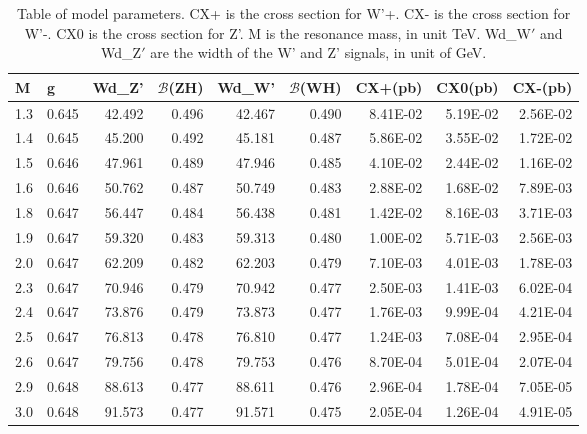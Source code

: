 \begin{table}[htbp]
\caption{Table of model parameters. CX+ is the cross section for W'+. 
CX- is the cross section for W'-. CX0 is the cross section for Z'. M is the resonance mass, in unit
TeV. Wd\_W$\prime$ and Wd\_Z$\prime$ are the width of the W' and Z' signals, in unit of GeV.}
\begin{tabular}{|r|r|r|r|r|r|r|r|r|}
\hline
\multicolumn{1}{|l|}{M} & \multicolumn{1}{l|}{ g} & \multicolumn{1}{l|}{Wd\_Z'} & \multicolumn{1}{l|}{$\mathcal{B}$(ZH)} & \multicolumn{1}{l|}{Wd\_W'} & \multicolumn{1}{l|}{$\mathcal{B}$(WH)} & \multicolumn{1}{l|}{ CX+(pb)} & \multicolumn{1}{l|}{ CX0(pb)} & \multicolumn{1}{l|}{ CX-(pb)} \\ \hline

1.3 & 0.645 & 42.492 & 0.496 & 42.467 & 0.490 & 8.41E-02 & 5.19E-02 & 2.56E-02 \\ \hline
1.4 & 0.645 & 45.200 & 0.492 & 45.181 & 0.487 & 5.86E-02 & 3.55E-02 & 1.72E-02 \\ \hline
1.5 & 0.646 & 47.961 & 0.489 & 47.946 & 0.485 & 4.10E-02 & 2.44E-02 & 1.16E-02 \\ \hline
1.6 & 0.646 & 50.762 & 0.487 & 50.749 & 0.483 & 2.88E-02 & 1.68E-02 & 7.89E-03 \\ \hline
1.8 & 0.647 & 56.447 & 0.484 & 56.438 & 0.481 & 1.42E-02 & 8.16E-03 & 3.71E-03 \\ \hline
1.9 & 0.647 & 59.320 & 0.483 & 59.313 & 0.480 & 1.00E-02 & 5.71E-03 & 2.56E-03 \\ \hline
2.0 & 0.647 & 62.209 & 0.482 & 62.203 & 0.479 & 7.10E-03 & 4.01E-03 & 1.78E-03 \\ \hline
2.3 & 0.647 & 70.946 & 0.479 & 70.942 & 0.477 & 2.50E-03 & 1.41E-03 & 6.02E-04 \\ \hline
2.4 & 0.647 & 73.876 & 0.479 & 73.873 & 0.477 & 1.76E-03 & 9.99E-04 & 4.21E-04 \\ \hline
2.5 & 0.647 & 76.813 & 0.478 & 76.810 & 0.477 & 1.24E-03 & 7.08E-04 & 2.95E-04 \\ \hline
2.6 & 0.647 & 79.756 & 0.478 & 79.753 & 0.476 & 8.70E-04 & 5.01E-04 & 2.07E-04 \\ \hline
2.9 & 0.648 & 88.613 & 0.477 & 88.611 & 0.476 & 2.96E-04 & 1.78E-04 & 7.05E-05 \\ \hline
3.0 & 0.648 & 91.573 & 0.477 & 91.571 & 0.475 & 2.05E-04 & 1.26E-04 & 4.91E-05 \\ \hline
\end{tabular}
\label{table:modelparam}
\end{table}




\clearpage
